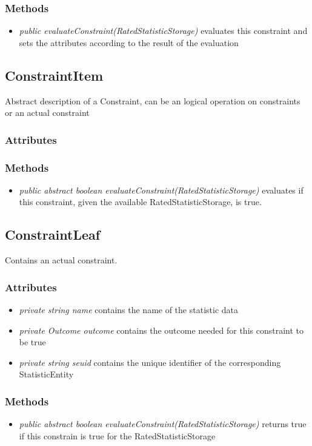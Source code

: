 \subsubsection{Methods}
\begin{itemize}
	\item \textit{ public evaluateConstraint(RatedStatisticStorage)  }
	evaluates this constraint and sets the attributes according to the result of the evaluation
\end{itemize}



\subsection{ConstraintItem}
	Abstract description of a Constraint, can be an logical operation on constraints or an actual constraint
\subsubsection{Attributes}
\subsubsection{Methods}
\begin{itemize}
	\item \textit{ public abstract boolean evaluateConstraint(RatedStatisticStorage) }
	evaluates if this constraint, given the available RatedStatisticStorage, is true. 
\end{itemize}		


\subsection{ConstraintLeaf }
Contains an actual constraint.

\subsubsection{Attributes}
\begin{itemize}
	\item \textit{ private  string name }
	contains the name of the statistic data
	\item \textit{ private  Outcome outcome }
	contains the outcome needed for this constraint to be true
	\item \textit{ private  string seuid }
	contains the unique identifier of the corresponding StatisticEntity
\end{itemize}
\subsubsection{Methods}
\begin{itemize}
	\item \textit{ public abstract boolean evaluateConstraint(RatedStatisticStorage) }
	returns true if this constrain is true for the RatedStatisticStorage
\end{itemize}


